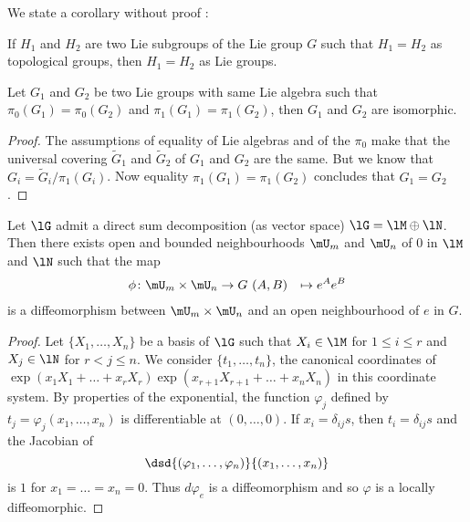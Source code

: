 We state a corollary without proof :

\begin{corollary} 
If $H_1$ and $H_2$ are two Lie subgroups of the Lie group $G$  such that $H_1=H_2$ as topological groups, then $H_1=H_2$ as Lie groups.
 \label{cor:top_subgroup}
\end{corollary}

\begin{proposition}
Let $G_1$ and $G_2$ be two Lie groups with same Lie algebra such that $\pi_0(G_1)=\pi_0(G_2)$ and $\pi_1(G_1)=\pi_1(G_2)$, then $G_1$ and $G_2$ are isomorphic.
\end{proposition}

\begin{proof}
The assumptions of equality of Lie algebras and of the $\pi_0$ make that the universal covering $\tilde G_1$ and $\tilde G_2$ of $G_1$ and $G_2$ are the same. But we know that $G_i=\tilde G_i/\pi_1(G_i)$. Now equality $\pi_1(G_1)=\pi_1(G_2)$ concludes that $G_1=G_2$.
\end{proof}

\begin{lemma}
Let $\lG$ admit a direct sum decomposition (as vector space) $\lG=\lM\oplus\lN$. Then there exists open and bounded neighbourhoods $\mU_m$ and $\mU_n$ of $0$ in $\lM$ and $\lN$ such that the map 
		\begin{equation}
		\begin{aligned}
			\phi \colon \mU_m\times\mU_n &\to G\
			(A,B)&\mapsto e^Ae^B
		\end{aligned}
	\end{equation}	
is a diffeomorphism between $\mU_m\times\mU_n$ and an open neighbourhood of $e$ in $G$.
 \label{lem:decomp}
\end{lemma}


\begin{proof}
Let $\{X_1,\ldots,X_n\}$ be a basis of $\lG$ such that $X_i\in\lM$ for $1\leq i\leq r$ and $X_j\in\lN$ for $r<j\leq n$. We consider $\{t_1,\ldots,t_n\}$, the canonical coordinates of $\exp(x_1X_1+\ldots+x_rX_r)\exp(x_{r+1}X_{r+1}+\ldots+x_nX_n)$ in this coordinate system. By properties of the exponential, the function $\varphi_j$ defined by $t_j=\varphi_j(x_1,\ldots,x_n)$ is differentiable at $(0,\ldots,0)$. If $x_i=\delta_{ij}s$, then $t_i=\delta_{ij}s$ and the Jacobian of 
\[
   \dsd{(\varphi_1,\ldots,\varphi_n)}{(x_1,\ldots,x_n)}
\]
is $1$ for $x_1=\ldots=x_n=0$. Thus $d\varphi_e$ is a diffeomorphism and so $\varphi$ is a locally diffeomorphic.
\end{proof}

